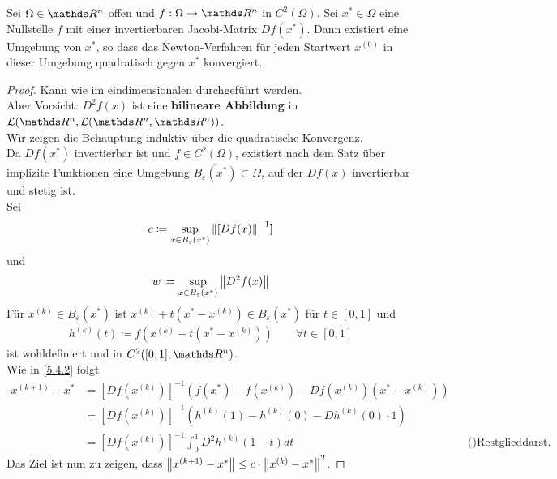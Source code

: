 \begin{Satze}
  Sei $\Omega\in\R^n$ offen und $f:\Omega\rightarrow\Ren$ in $C^2(\Omega)$.
  Sei $x^{*}\in\Omega $ eine Nullstelle $f$ mit einer invertierbaren Jacobi-Matrix $Df(x^{*})$.
  Dann existiert eine Umgebung von $x^{*}$, so dass das Newton-Verfahren 
  für jeden Startwert $x^{(0)}$ in dieser Umgebung
  quadratisch gegen $x^{*}$ konvergiert.
\end{Satze}

\begin{proof}
  Kann wie im eindimensionalen durchgeführt werden.\\
  Aber Vorsicht: $D^2f(x)$ ist eine \textbf{bilineare Abbildung} in 
  $\mathcal{L}(\Ren, \mathcal{L}(\Ren, \Ren))$. \\
  
  Wir zeigen die Behauptung induktiv über die quadratische Konvergenz.\\
  Da $Df(x^{*})$ invertierbar ist und $f\in C^2(\Omega) $,
  existiert nach dem Satz über implizite Funktionen
  eine Umgebung $\overline{B_\varepsilon(x^{*})}\subset \Omega$,
  auf der $Df(x)$ invertierbar und stetig ist.\\
  Sei 
  \begin{gather*}
    c\coloneqq \sup_{x\in B_\varepsilon(x^{*})} \nn[[Df(x)]^{-1}]
  \end{gather*}
  und 
  \begin{gather*}
    w\coloneqq \sup_{x\in B_\varepsilon(x^{*})}\nn[D^2f(x)]
  \end{gather*}
  Für $x^{(k)}\in B_\varepsilon(x^{*}) $ ist $x^{(k)}+t(x^{*}-x^{(k)})\in B_\varepsilon(x^{*})$
  für $t\in [0,1]$ und 
  \begin{gather*}
    h^{(k)}(t) \coloneqq f(x^{(k)}+ t(x^{*}-x^{(k)}))\qquad \forall t\in [0,1]
  \end{gather*}
  ist wohldefiniert und in $C^2([0,1], \Ren)$.\\
  Wie in \ref{5.4.2} folgt 
  \begin{align*}
    x^{(k+1)}-x^{*} &= [Df(x^{(k)})]^{-1}\left(f(x^{*})-f(x^{(k)})-Df(x^{(k)})(x^{*}-x^{(k)})\right)\\
                    &= [Df(x^{(k)})]^{-1}\left( h^{(k)}(1)-h^{(k)}(0)-Dh^{(k)}(0)\cdot 1\right)\\
                    &= [Df(x^{(k)})]^{-1} \int_{0}^{1}D^2h^{(k)}(1-t)dt &&\text{()Restglieddarst. der Taylorentw.)}
  \end{align*}
  Das Ziel ist nun zu zeigen, dass $\nn[x^{(k+1)}-x^{*}] \leq c\cdot \nn[x^{(k)}-x^{*}]^2$.

\end{proof}
